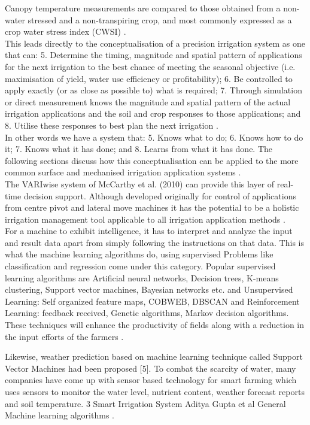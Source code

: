 \documentclass[letterpaper, 10 pt, conference]{ieeeconf}  %
\begin{document}
Canopy temperature measurements are compared to those obtained from a non-water stressed and a non-transpiring crop, and most commonly expressed as a crop water stress index (CWSI) \cite{Smith2011}.\\


This leads directly to the conceptualisation of a precision irrigation system as one that can: 5. Determine the timing, magnitude and spatial pattern of applications for the next irrigation to the best chance of meeting the seasonal objective (i.e. maximisation of yield, water use efficiency or profitability); 6. Be controlled to apply exactly (or as close as possible to) what is required; 7. Through simulation or direct measurement knows the magnitude and spatial pattern of the actual irrigation applications and the soil and crop responses to those applications; and 8. Utilise these responses to best plan the next irrigation \cite{Smith2011}.\\
In other words we have a system that: 5. Knows what to do; 6. Knows how to do it;
7. Knows what it has done; and 8. Learns from what it has done. The following sections discuss how this conceptualisation can be applied to the more common surface and mechanised irrigation application systems \cite{Smith2011}.\\

The VARIwise system of McCarthy et al. (2010) can provide this layer of real-time decision support. Although developed originally for control of applications from centre pivot and lateral move machines it has the potential to be a holistic irrigation management tool applicable to all irrigation application methods \cite{Smith2011}.\\

For a machine to exhibit intelligence, it has to interpret and analyze the input and result data apart from simply following the instructions on that data. This is what the machine learning algorithms do, using supervised  Problems like classification and regression come under this category. Popular supervised learning algorithms are Artificial neural networks, Decision trees, K-means clustering, Support vector machines, Bayesian networks etc. and Unsupervised Learning: Self organized feature maps, COBWEB, DBSCAN  and Reinforcement Learning: feedback received, Genetic algorithms, Markov decision algorithms.  These techniques will enhance the productivity of fields along with a reduction in the input efforts of the farmers \cite{kaur2016machine}.

Likewise, weather prediction based on machine learning technique called Support Vector Machines had been proposed [5].
To combat the scarcity of water, many companies have come up with sensor based technology for smart farming which uses sensors to monitor the water level, nutrient content, weather forecast reports and soil temperature.
3 Smart Irrigation System Aditya Gupta et al General Machine learning algorithms  \cite{kaur2016machine}.
\end{document}
